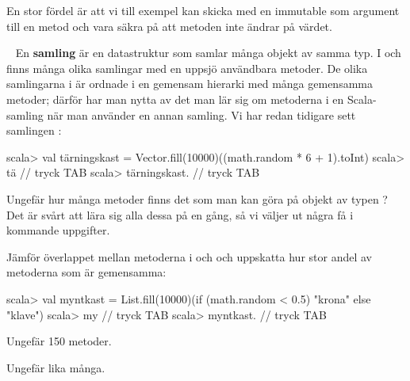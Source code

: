 \SubtaskSolved   En stor fördel är att vi till exempel kan skicka med en immutable som argument till en metod och vara säkra på att metoden inte ändrar på värdet.


\QUESTEND









\QUESTBEGIN

\Task  \what~  En \textbf{samling}  är en datastruktur som samlar många objekt av samma typ. I  och  finns många olika samlingar med en uppsjö användbara metoder. De olika samlingarna i  är ordnade i en gemensam hierarki med många gemensamma metoder; därför har man nytta av det man lär sig om metoderna i en Scala-samling när man använder en annan samling. Vi har redan tidigare sett samlingen :

\begin{REPL}
scala> val tärningskast = Vector.fill(10000)((math.random * 6 + 1).toInt)
scala> tä   // tryck TAB
scala> tärningskast.  // tryck TAB
\end{REPL}

\Subtask Ungefär hur många metoder finns det som man kan göra på objekt av typen ? Det är svårt att lära sig alla dessa på en gång, så vi väljer ut några få i kommande uppgifter.

\Subtask Jämför överlappet mellan metoderna i  och  och uppskatta hur stor andel av metoderna som är gemensamma:
\begin{REPL}
scala> val myntkast =
         List.fill(10000)(if (math.random < 0.5) "krona" else "klave")
scala> my   // tryck TAB
scala> myntkast.  // tryck TAB
\end{REPL}

\SOLUTION


\TaskSolved \what


\SubtaskSolved   Ungefär 150 metoder.

\SubtaskSolved   Ungefär lika många.


\QUESTEND









\QUESTBEGIN

